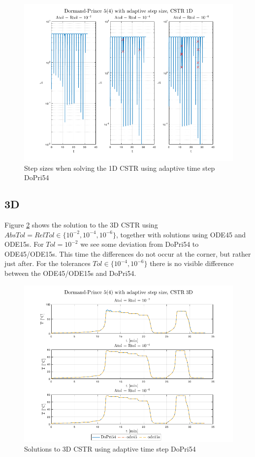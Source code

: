 \begin{figure}[H]
    \centering
    \includegraphics[width=\textwidth]{graphics/opg6/cstr_1d_h.png}
    \caption{Step sizes when solving the 1D CSTR using adaptive time step DoPri54}
    \label{fig6:1d_h}
\end{figure}

\subsection{3D}
Figure \ref{fig6:3d_sol} shows the solution to the 3D CSTR using $AbsTol=RelTol \in \{10^{-2}, 10^{-4}, 10^{-6}\}$, together with solutions using ODE45 and ODE15s. For $Tol=10^{-2}$ we see some deviation from DoPri54 to ODE45/ODE15s. This time the differences do not occur at the corner, but rather just after. For the tolerances $Tol \in \{10^{-4}, 10^{-6}\}$ there is no visible difference between the ODE45/ODE15s and DoPri54.

\begin{figure}[H]
    \centering
    \includegraphics[width=\textwidth]{graphics/opg6/cstr-3d.png}
    \caption{Solutions to 3D CSTR using adaptive time step DoPri54}
    \label{fig6:3d_sol}
\end{figure}

